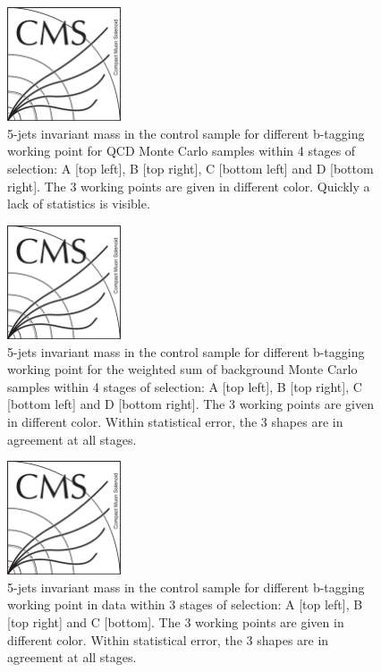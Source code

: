\begin{figure}[!Hhtbp]
  \begin{center}
    \includegraphics[width=0.3\textwidth]{figs/CMSlogo.png}
    \caption{5-jets invariant mass in the control sample for different b-tagging working point for QCD Monte Carlo samples within 4 stages of selection: A [top left], B [top right], C [bottom left] and D [bottom right]. The 3 working points are given in different color. Quickly a lack of statistics is visible.}
    \label{fig:StageWPQCD}
  \end{center}
\end{figure}\clearpage

\begin{figure}[!Hhtbp]
  \begin{center}
    \includegraphics[width=0.3\textwidth]{figs/CMSlogo.png}
    \caption{5-jets invariant mass in the control sample for different b-tagging working point for the weighted sum of background Monte Carlo samples within 4 stages of selection: A [top left], B [top right], C [bottom left] and D [bottom right]. The 3 working points are given in different color. Within statistical error, the 3 shapes are in agreement at all stages.}
    \label{fig:StageWPSum}
  \end{center}
\end{figure}\clearpage

\begin{figure}[!Hhtbp]
  \begin{center}
    \includegraphics[width=0.3\textwidth]{figs/CMSlogo.png}
    \caption{5-jets invariant mass in the control sample for different b-tagging working point in data within 3 stages of selection: A [top left], B [top right] and C [bottom]. The 3 working points are given in different color. Within statistical error, the 3 shapes are in agreement at all stages.}
    \label{fig:StageWPData}
  \end{center}
\end{figure}\clearpage

